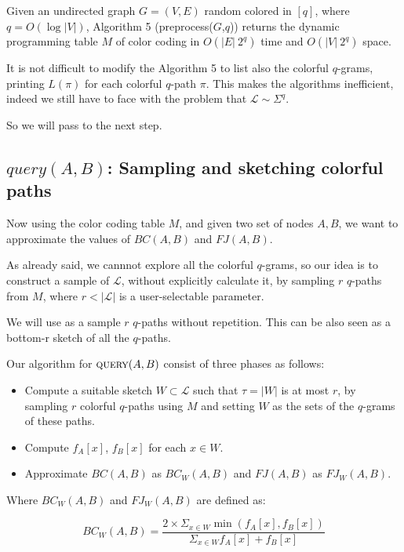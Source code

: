 \begin{lemma}
	Given an undirected graph $G=(V, E)$ random colored in $[q]$, where $q = O(\log |V|)$, Algorithm 5 (preprocess($G$,$q$)) returns the dynamic programming table $M$ of color coding in $O(|E|\ 2^{q})$ time and $O(|V|\ 2^{q})$ space. 
\end{lemma}

\bigskip

It is not difficult to modify the Algorithm 5 to list also the colorful $q$-grams, printing $L(\pi)$ for each colorful $q$-path $\pi$. This makes the algorithms inefficient, indeed we still have to face with the problem that $\mathcal{L} \sim \Sigma^{q}$.\bigskip

So we will pass to the next step.

\subsection*{$query(A,B)$: Sampling and sketching colorful paths}

Now using the color coding table $M$, and given two set of nodes $A, B$, we want to approximate the values of $BC(A,B)$ and $FJ(A,B)$.\bigskip

As already said, we cannnot explore all the colorful $q$-grams, so our idea is to construct a sample of $\mathcal{L}$, without explicitly calculate it, by sampling $r$ $q$-paths from $M$, where $r < |\mathcal{L}|$ is a user-selectable parameter.

We will use as a sample $r$ $q$-paths  without repetition. This can be also seen as a bottom-r sketch of all the $q$-paths.\bigskip 

\clearpage

Our algorithm for $\textsc{query}(A,B)$ consist of three phases as follows:

\begin{itemize}
	\item Compute a suitable sketch $W \subset \mathcal{L}$ such that $\tau = |W|$ is at most $r$, by sampling $r$ colorful $q$-paths using $M$ and setting $W$ as the sets of the $q$-grams of these paths.
	\item Compute $f_{A}[x]$, $f_{B}[x]$ for each $x \in W$.
	\item Approximate $BC(A,B)$ as $BC_{W}(A,B)$ and $FJ(A,B)$ as $FJ_{W}(A,B)$.
\end{itemize}

Where $BC_{W}(A,B)$ and $FJ_{W}(A,B)$ are defined as:

\begin{equation}\label{bc-w}
	BC_{W}(A,B) = \frac{ 2 \times \Sigma_{x \in W} \min(f_{A}[x], f_{B}[x]) }{ \Sigma_{x \in W} f_{A}[x] + f_{B}[x] }
\end{equation}

